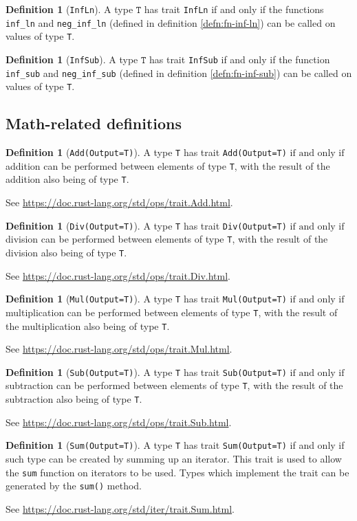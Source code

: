\documentclass[11pt,a4paper]{article}
\theoremstyle{definition}
\newtheorem{definition}[theorem]{Definition}
\newcommand{\inRust}[2]{See \url{#2}.}
\newcommand{\T}{\texttt{T}}
\newcommand{\iffText}{\text{if and only if}}
\begin{document}
\begin{definition}[\texttt{InfLn}]
A type $\T$ has trait \texttt{InfLn} if and only if the functions \texttt{inf\_ln} and \texttt{neg\_inf\_ln} (defined in definition \ref{defn:fn-inf-ln}) can be called on values of type \texttt{T}. 
\end{definition}

\begin{definition}[\texttt{InfSub}]
A type $\T$ has trait \texttt{InfSub} if and only if the function \texttt{inf\_sub} and \texttt{neg\_inf\_sub} (defined in definition \ref{defn:fn-inf-sub}) can be called on values of type \texttt{T}. 
\end{definition}

\subsection{Math-related definitions}
\begin{definition}[\texttt{Add(Output=T)}]
    A type \texttt{T} has trait \texttt{Add(Output=T)} $\iffText$ addition can be performed between elements of type \texttt{T}, with the result of the addition also being of type \texttt{T}.
    
    \inRust{Trait std::ops::Add}{https://doc.rust-lang.org/std/ops/trait.Add.html}
\end{definition}
\begin{definition}[\texttt{Div(Output=T)}]
    A type \texttt{T} has trait \texttt{Div(Output=T)} $\iffText$ division can be performed between elements of type \texttt{T}, with the result of the division also being of type \texttt{T}.
    
    \inRust{Trait std::ops::Div}{https://doc.rust-lang.org/std/ops/trait.Div.html}
\end{definition}
\begin{definition}[\texttt{Mul(Output=T)}]
    A type \texttt{T} has trait \texttt{Mul(Output=T)} $\iffText$ multiplication can be performed between elements of type \texttt{T}, with the result of the multiplication also being of type \texttt{T}.
    
    \inRust{Trait std::ops::Mul}{https://doc.rust-lang.org/std/ops/trait.Mul.html}
\end{definition}
\begin{definition}[\texttt{Sub(Output=T)}]
\label{defn:trait-sub}
    A type \texttt{T} has trait \texttt{Sub(Output=T)} $\iffText$ subtraction can be performed between elements of type \texttt{T}, with the result of the subtraction also being of type \texttt{T}.
    
    \inRust{Trait std::ops::Sub}{https://doc.rust-lang.org/std/ops/trait.Sub.html}
\end{definition}
\begin{definition}[\texttt{Sum(Output=T)}]
    A type \texttt{T} has trait \texttt{Sum(Output=T)} if and only if such type can be created by summing up an iterator. This trait is used to allow the \texttt{sum} function on iterators to be used. Types which implement the trait can be generated by the \texttt{sum()} method.
    
    \inRust{Trait std::iter::Sum}{https://doc.rust-lang.org/std/iter/trait.Sum.html}
\end{definition}
\end{document}

